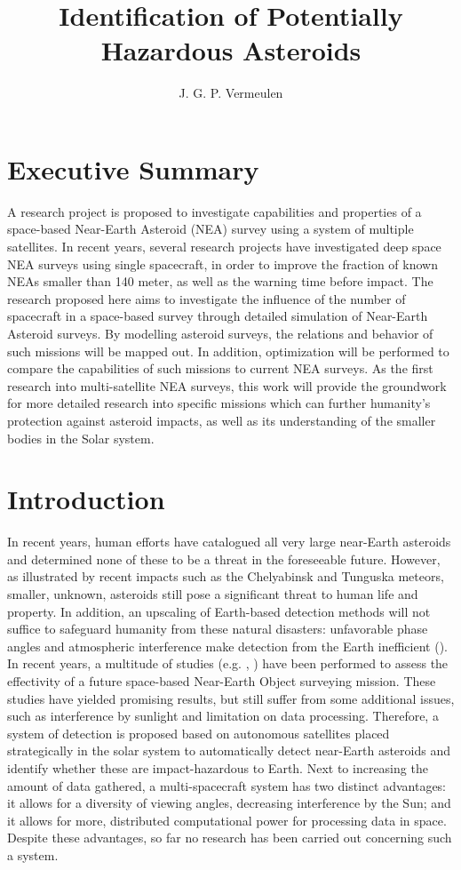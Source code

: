 \documentclass[12pt, english, NoHyper]{AE4010-template}
\title{Identification of Potentially Hazardous Asteroids}
\author{J. G. P. Vermeulen}
\begin{document}
\maketitle

\section*{Executive Summary}
A research project is proposed to investigate capabilities and properties of a space-based Near-Earth Asteroid (NEA) survey using a system of multiple satellites. In recent years, several research projects have investigated deep space NEA surveys using single spacecraft, in order to improve the fraction of known NEAs smaller than 140 meter, as well as the warning time before impact. The research proposed here aims to investigate the influence of the number of spacecraft in a space-based survey through detailed simulation of Near-Earth Asteroid surveys. By modelling asteroid surveys, the relations and behavior of such missions will be mapped out. In addition, optimization will be performed to compare the capabilities of such missions to current NEA surveys. As the first research into multi-satellite NEA surveys, this work will provide the groundwork for more detailed research into specific missions which can further humanity's protection against asteroid impacts, as well as its understanding of the smaller bodies in the Solar system.




\section{Introduction}
In recent years, human efforts have catalogued all very large near-Earth asteroids and determined none of these to be a threat in the foreseeable future. However, as illustrated by recent impacts such as the Chelyabinsk and Tunguska meteors, smaller, unknown, asteroids still pose a significant threat to human life and property. In addition, an upscaling of Earth-based detection methods will not suffice to safeguard humanity from these natural disasters: unfavorable phase angles and atmospheric interference make detection from the Earth inefficient (\cite{DefendingPlanetEarth}). In recent years, a multitude of studies (e.g. \cite{NEOSDT1}, \cite{ThesisOlga}) have been performed to assess the effectivity of a future space-based Near-Earth Object surveying mission. These studies have yielded promising results, but still suffer from some additional issues, such as interference by sunlight and limitation on data processing. Therefore, a system of detection is proposed based on autonomous satellites placed strategically in the solar system to automatically detect near-Earth asteroids and identify whether these are impact-hazardous to Earth. Next to increasing the amount of data gathered, a multi-spacecraft system has two distinct advantages: it allows for a diversity of viewing angles, decreasing interference by the Sun; and it allows for more, distributed computational power for processing data in space. Despite these advantages, so far no research has been carried out concerning such a system.\\
\end{document}
